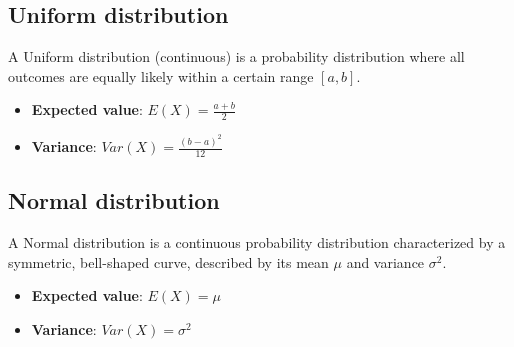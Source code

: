 \documentclass[11pt]{article}
\begin{document}
\subsection*{Uniform distribution}
A Uniform distribution (continuous) is a probability distribution where all outcomes are equally likely within a certain range $[a, b]$.

\begin{itemize}
    \item \textbf{Expected value}: $E(X) = \frac{a + b}{2}$
    \item \textbf{Variance}: $Var(X) = \frac{(b - a)^2}{12}$
\end{itemize}

\subsection*{Normal distribution}
A Normal distribution is a continuous probability distribution characterized by a symmetric, bell-shaped curve, described by its mean $\mu$ and variance $\sigma^2$.

\begin{itemize}
    \item \textbf{Expected value}: $E(X) = \mu$
    \item \textbf{Variance}: $Var(X) = \sigma^2$
\end{itemize}
\end{document}
